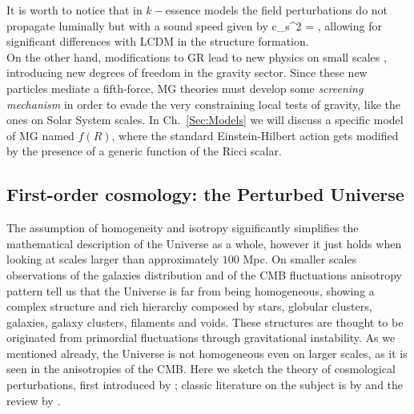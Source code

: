 It is worth to notice that in $k-$essence models the field perturbations do not propagate luminally but
with a sound speed given by
%
\be
c_s^2 = ,
\ee
%
allowing for significant differences with \gls{LCDM} in the structure formation.\\
On the other hand, modifications to GR lead to new physics on small scales \citep{Lue2004}, 
introducing new degrees of freedom in the gravity sector. Since these new particles mediate a fifth-force,
\gls{MG} theories must develop some \emph{screening mechanism} in order to evade the very constraining 
local tests of gravity, like the ones on Solar System scales. In Ch.~\eqref{Sec:Models} we will discuss a specific model of \gls{MG} named $f(R)$, where the standard Einstein-Hilbert action gets modified by the presence of a generic function of the Ricci scalar.

\subsection{First-order cosmology: the Perturbed Universe}
\label{sec:Cosmo_pert}
The assumption of homogeneity and isotropy significantly simplifies the mathematical description of
the Universe as a whole, however it just holds when looking at scales larger than approximately $100$ 
Mpc. On smaller scales observations of the galaxies distribution and of the \gls{CMB} fluctuations 
anisotropy pattern tell us that the Universe is far from being homogeneous, showing a complex structure and rich hierarchy composed by stars, globular clusters, galaxies, galaxy clusters, filaments and voids. 
These structures are thought to be originated from primordial fluctuations through gravitational instability. 
As we mentioned already, the Universe is not homogeneous even on larger scales, as it is seen in the anisotropies of the \gls{CMB}. Here we sketch the theory of cosmological perturbations, first introduced by \citet{Lifshitz1946}; classic literature on the subject is by \citet{Kodama1984, Ma1995} and the review by \citet{Bernardeau2002}.

